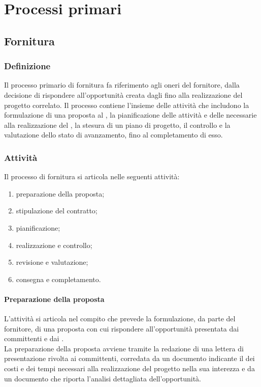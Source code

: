 \chapter{Processi primari}
\section{Fornitura} \label{sec:fornitura}
\subsection{Definizione}
Il processo primario di fornitura fa riferimento agli oneri del fornitore, dalla decisione di rispondere all'opportunità creata dagli  fino alla realizzazione del progetto correlato. Il processo contiene l'insieme delle attività che includono la formulazione di una proposta al , la pianificazione delle attività e delle  necessarie alla realizzazione del , la stesura di un piano di progetto, il controllo e la valutazione dello stato di avanzamento, fino al completamento di esso.
\subsection{Attività}
Il processo di fornitura si articola nelle seguenti attività:
\begin{enumerate}
    \item preparazione della proposta;
    \item stipulazione del contratto;
    \item pianificazione;
    \item realizzazione e controllo;
    \item revisione e valutazione;
    \item consegna e completamento.
\end{enumerate}

\subsubsection{Preparazione della proposta}
L'attività si articola nel compito che prevede la formulazione, da parte del fornitore, di una proposta con cui rispondere all'opportunità presentata dai committenti e dai .\\
La preparazione della proposta avviene tramite la redazione di una lettera di presentazione rivolta ai committenti, corredata da un documento indicante il  dei costi e dei tempi necessari alla realizzazione del progetto nella sua interezza e da un documento che riporta l'analisi dettagliata dell'opportunità.


